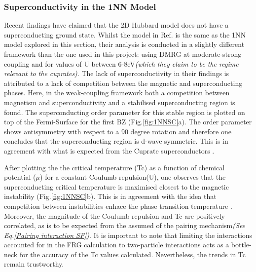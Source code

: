 \documentclass[12pt]{article}
\begin{document}
\subsubsection{Superconductivity in the 1NN Model}

Recent findings have claimed that the 2D Hubbard model does not have a superconducting ground state\cite{qin2020absence}. 
Whilst the model in Ref. \cite{qin2020absence} is the same as the 1NN model explored in this section, their analysis is conducted in a 
slightly different framework than the one used in this project: using DMRG \cite{white1992density} 
at moderate-strong coupling and for values of U between 6-8eV\textit{(which they claim to be the 
regime relevant to the cuprates)}.
The lack of superconductivity in their findings is attributed to a lack of competition 
between the magnetic and superconducting phases. Here, in the weak-coupling framework both a competition between magnetism and superconductivity and 
a stabilised superconducting region is found. The superconducting order parameter for this stable region is plotted on top of the Fermi-Surface for the first BZ (Fig.\ref{fig:1NNSC}a).
The order parameter shows antisymmetry with respect to a 90 degree rotation and therefore one concludes that
the superconducting region is d-wave symmetric. This is in agreement with what is expected from the Cuprate superconductors \cite{tsuei2000pairing}.\par
\medskip
\noindent 
After plotting the the critical temperature (Tc) as a function of chemical potential ($\mu$) for a constant Coulumb repulsion(U), one observes that
the superconducting critical temperature is maximised closest to the magnetic instability (Fig.\ref{fig:1NNSC}b).
This is in agreement with the idea that competition between instabilities
enhace the phase transition temperature \cite{maple1995interplay,sun2016dome}. Moreover, the magnitude of the Coulumb repulsion and Tc are positively correlated, as is to be expected from the assumed of the pairing mechanism\textit{(See Eq.\ref{Pairing interaction SF})}.
It is important to note that limiting the interactions 
accounted for in the FRG calculation to two-particle interactions acts as a bottle-neck for the accuracy 
of the Tc values calculated. Nevertheless, the trends in Tc remain trustworthy. 
\end{document}
